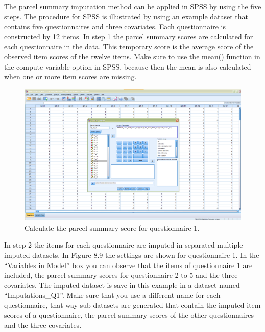 \documentclass[
]{book}
\begin{document}
The parcel summary imputation method can be applied in SPSS by using the five steps. The procedure for SPSS is illustrated by using an example dataset that contains five questionnaires and three covariates. Each questionnaire is constructed by 12 items. In step 1 the parcel summary scores are calculated for each questionnaire in the data. This temporary score is the average score of the observed item scores of the twelve items. Make sure to use the mean() function in the compute variable option in SPSS, because then the mean is also calculated when one or more item scores are missing.

\begin{figure}

{\centering \includegraphics[width=0.9\linewidth]{images/fig8.7} 

}

\caption{Calculate the parcel summary score for questionnaire 1.}\label{fig:fig8-7}
\end{figure}

In step 2 the items for each questionnaire are imputed in separated multiple imputed datasets. In Figure 8.9 the settings are shown for questionnaire 1. In the ``Variables in Model'' box you can observe that the items of questionnaire 1 are included, the parcel summary scores for questionnaire 2 to 5 and the three covariates. The imputed dataset is save in this example in a dataset named ``Imputations\_Q1''. Make sure that you use a different name for each questionnaire, that way sub-datasets are generated that contain the imputed item scores of a questionnaire, the parcel summary scores of the other questionnaires and the three covariates.
\end{document}
